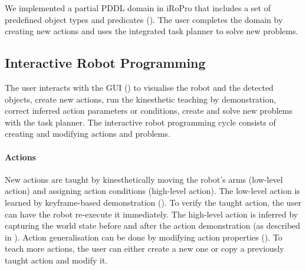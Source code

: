 We implemented a partial PDDL domain in iRoPro that includes a set of predefined object types and predicates ().
The user completes the domain by creating new actions and uses the integrated task planner to solve new problems.


\subsection{Interactive Robot Programming}
\label{sec:interactive}
The user interacts with the GUI () to visualise the robot and the detected objects, create new actions, run the kinesthetic teaching by demonstration, correct inferred action parameters or conditions, create and solve new problems with the task planner.
The interactive robot programming cycle consists of creating and modifying actions and problems.
\paragraph{Actions} New actions are taught by kinesthetically moving the robot's arms (low-level action) and assigning action conditions (high-level action).
The low-level action is learned %
by keyframe-based demonstration ().
To verify the taught action, the user can have the robot re-execute it immediately.
The high-level action is inferred by capturing the world state before and after the action demonstration (as described in ).
Action generalisation can be done by modifying action properties ().
To teach more actions, the user can either create a new one or copy a previously taught action and modify it.
